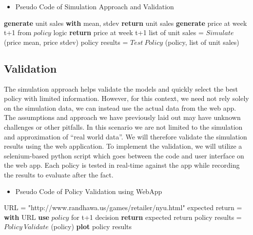 \documentclass[11pt,a4paper]{article}
\begin{document}
\begin{itemize}[leftmargin=*]
    \item Pseudo Code of Simulation Approach and Validation
\end{itemize}

\begin{algorithmic}[1]
            \State \textbf{generate} unit sales \textbf{with} mean, stdev
        \EndFor
        \State \textbf{return} unit sales
    \EndProcedure
    \State 
            \State \textbf{generate} price at week t+1 from $policy$ logic
        \EndFor
        \State \textbf{return} price at week t+1
    \EndProcedure
    \State
            \State list of unit sales = $Simulate$ (price mean, price stdev) 
            \State policy results = $Test\ Policy$ (policy, list of unit sales) 
        \EndFor
    \EndFor
\end{algorithmic}

\subsection{Validation}
The simulation approach helps validate the models and quickly select the best policy with limited information. 
However, for this context, we need not rely solely on the simulation data, we can instead use the actual data from the web app. 
The assumptions and approach we have previously laid out may have unknown challenges or other pitfalls. 
In this scenario we are not limited to the simulation and approximation of “real world data”. 
We will therefore validate the simulation results using the web application. 
To implement the validation, we will utilize a selenium-based python script which goes between the code and user interface on the web app. 
Each policy is tested in real-time against the app while recording the results to evaluate after the fact. \\

\begin{itemize}[leftmargin=*]
    \item Pseudo Code of Policy Validation using WebApp
\end{itemize}

\begin{algorithmic}[1]
        \State URL = "http://www.randhawa.us/games/retailer/nyu.html"
        \State expected return = \textbf{with} URL \textbf{use} $policy$ for t+1 decision
        \State \textbf{return} expected return
    \EndProcedure
    \State
            \State policy results = $Policy\ Validate$ (policy) 
        \EndFor
    \EndFor
    \State \textbf{plot} policy results
\end{algorithmic}
\pagebreak
\end{document}
